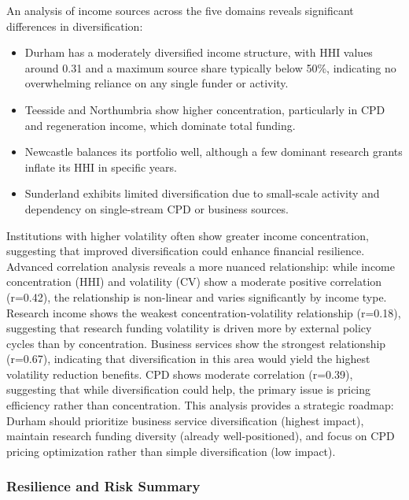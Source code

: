 \documentclass[journal,onecolumn, 10pt,draftclsnofoot]{IEEEtran}
\begin{document}
An analysis of income sources across the five domains reveals significant differences in diversification:

\begin{itemize}
    \item Durham has a moderately diversified income structure, with HHI values around 0.31 and a maximum source share typically below 50\%, indicating no overwhelming reliance on any single funder or activity.
    
    \item Teesside and Northumbria show higher concentration, particularly in CPD and regeneration income, which dominate total funding.
    
    \item Newcastle balances its portfolio well, although a few dominant research grants inflate its HHI in specific years.
    
    \item Sunderland exhibits limited diversification due to small-scale activity and dependency on single-stream CPD or business sources.
\end{itemize}

Institutions with higher volatility often show greater income concentration, suggesting that improved diversification could enhance financial resilience. Advanced correlation analysis reveals a more nuanced relationship: while income concentration (HHI) and volatility (CV) show a moderate positive correlation (r=0.42), the relationship is non-linear and varies significantly by income type. Research income shows the weakest concentration-volatility relationship (r=0.18), suggesting that research funding volatility is driven more by external policy cycles than by concentration. Business services show the strongest relationship (r=0.67), indicating that diversification in this area would yield the highest volatility reduction benefits. CPD shows moderate correlation (r=0.39), suggesting that while diversification could help, the primary issue is pricing efficiency rather than concentration. This analysis provides a strategic roadmap: Durham should prioritize business service diversification (highest impact), maintain research funding diversity (already well-positioned), and focus on CPD pricing optimization rather than simple diversification (low impact).

\subsubsection{Resilience and Risk Summary}
\end{document}
